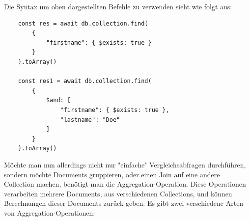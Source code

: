 \cite{mongodb_query_operations}
\newline
Die Syntax um oben dargestellten Befehle zu verwenden sieht wie folgt aus:
\newline
\begin{lstlisting}
    const res = await db.collection.find(
        {
            "firstname": { $exists: true }
        }
    ).toArray()

    const res1 = await db.collection.find(
        {
            $and: [
                "firstname": { $exists: true },
                "lastname": "Doe"
            ]
        }
    ).toArray()
\end{lstlisting}
\cite{mongodb_query_basics}
\newline
Möchte man nun allerdings nicht nur "einfache" Vergleichsabfragen durchführen, sondern möchte Documents gruppieren, oder einen Join auf eine andere Collection machen, benötigt man die Aggregation-Operation. Diese Operationen verarbeiten mehrere Documents, aus verschiedenen Collections, und können Berechnungen dieser Documents zurück geben. Es gibt zwei verschiedene Arten von Aggregation-Operationen:
